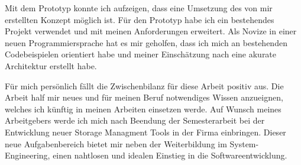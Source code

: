 Mit dem Prototyp konnte ich aufzeigen, dass eine Umsetzung des von mir erstellten Konzept möglich ist. Für den Prototyp habe ich ein bestehendes Projekt verwendet und mit meinen Anforderungen erweitert. Als Novize in einer neuen Programmiersprache hat es mir geholfen, dass ich mich an bestehenden Codebeispielen orientiert habe und meiner Einschätzung nach eine akurate Architektur erstellt habe.

Für mich persönlich fällt die Zwischenbilanz für diese Arbeit positiv aus. Die Arbeit half mir neues und für meinen Beruf notwendiges Wissen anzueignen, welches ich künftig in meinen Arbeiten einsetzen werde. Auf Wunsch meines Arbeitgebers werde ich mich nach Beendung der Semesterarbeit bei der Entwicklung neuer Storage Managment Tools in der Firma einbringen.
Dieser neue Aufgabenbereich bietet mir neben der Weiterbildung im System-Engineering, einen nahtlosen und idealen Einstieg in die Softwareentwicklung.




